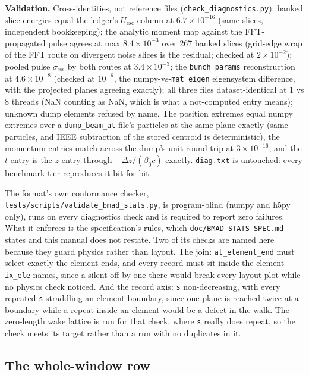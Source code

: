 \documentclass[11pt]{article}
\newcommand{\code}[1]{\texttt{#1}}
\newenvironment{validation}{\par\small\textbf{Validation.}}{\par}
\begin{document}
\begin{validation}
Cross-identities, not reference files (\code{check\_diagnostics.py}): banked slice
energies equal the ledger's $U_{\mathrm{esc}}$ column at $6.7\times10^{-16}$ (same
slices, independent bookkeeping); the analytic moment map against the FFT-propagated
pulse agrees at max $8.4\times10^{-3}$ over 267 banked slices (grid-edge wrap of the
FFT route on divergent noise slices is the residual; checked at $2\times10^{-2}$);
pooled pulse $\sigma_{xx}$ by both routes at $3.4\times10^{-3}$; the
\code{bunch\_params} reconstruction at $4.6\times10^{-8}$ (checked at $10^{-6}$, the
numpy-vs-\code{mat\_eigen} eigensystem difference, with the projected planes agreeing
exactly); all three files dataset-identical at 1 vs 8 threads (NaN counting as NaN,
which is what a not-computed entry means); unknown dump elements refused by name. The
position extremes equal numpy extremes over a \code{dump\_beam\_at} file's particles at
the same plane exactly (same particles, and IEEE subtraction of the stored centroid is
deterministic), the momentum entries match across the dump's unit round trip at
$3\times10^{-16}$, and the $t$ entry is the $z$ entry through $-\Delta z/(\beta_0 c)$
exactly. \code{diag.txt} is untouched: every benchmark tier reproduces it bit for bit.

The format's own conformance checker, \code{tests/scripts/validate\_bmad\_stats.py},
is program-blind (numpy and h5py only), runs on every diagnostics check and is
required to report zero failures. What it enforces is the specification's rules, which
\code{doc/BMAD-STATS-SPEC.md} states and this manual does not restate. Two of its
checks are named here because they guard physics rather than layout. The join:
\code{at\_element\_end} must select exactly the element ends, and every record must sit
inside the element \code{ix\_ele} names, since a silent off-by-one there would break
every layout plot while no physics check noticed. And the record axis: \code{s}
non-decreasing, with every repeated \code{s} straddling an element boundary, since one
plane is reached twice at a boundary while a repeat inside an element would be a defect
in the walk. The zero-length wake lattice is run for that check, where \code{s} really
does repeat, so the check meets its target rather than a run with no duplicates in it.
\end{validation}

\subsection{The whole-window row}\label{sec:pool}
\end{document}
